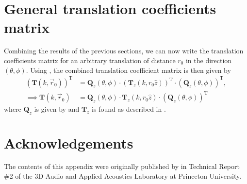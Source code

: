 \section{General translation coefficients matrix}\label{sec:A1_Navigation_Filters:Translation_Filters}
Combining the results of the previous sections, we can now write the translation coefficients matrix for an arbitrary translation of distance $r_0$ in the direction $(\theta,\phi)$.
Using , the combined translation coefficient matrix is then given by
\begin{equation}
\begin{aligned}
\left( \mathbf{T}(k, \vec{r}_0) \right)^\text{T} &= \mathbf{Q}_z(\theta,\phi) \cdot \left( \mathbf{T}_z(k, r_0 \hat{z}) \right)^\text{T} \cdot (\mathbf{Q}_z(\theta,\phi))^\text{T}, \\
\implies \mathbf{T}(k, \vec{r}_0) &= \mathbf{Q}_z(\theta,\phi) \cdot \mathbf{T}_z(k, r_0 \hat{z}) \cdot (\mathbf{Q}_z(\theta,\phi))^\text{T}
\end{aligned}
\end{equation}
where $\mathbf{Q}_z$ is given by  and $\mathbf{T}_z$ is found as described in . 

\section*{Acknowledgements}
The contents of this appendix were originally published by \citet{TylkaChoueiri2019a} in Technical Report \#2 of the 3D Audio and Applied Acoustics Laboratory at Princeton University.
